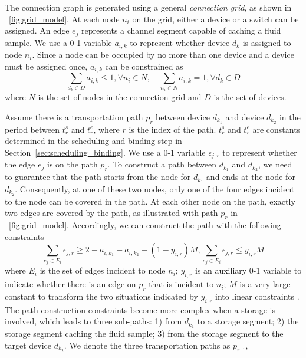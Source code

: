 The connection graph is generated using a general \textit{connection grid}, as
shown in \figname~\ref{fig:grid_model}. At each node $n_i$ on the grid,
either a device or a switch can be assigned. An edge $e_j$ represents
a channel segment capable of caching a fluid sample.
We use a 0-1 variable $a_{i,k}$ to represent whether device $d_k$
is assigned to node $n_i$. Since a node can be occupied by no more than one device
and a device must be assigned once, $a_{i,k}$ can be constrained as
\begin{equation} \label{eq:device_node_1}
\sum_{d_k\in D} a_{i,k}\le 1, \forall n_i\in N, \quad
\sum_{n_i\in N} a_{i,k}=1, \forall d_k\in D
\end{equation}
where $N$ is the set of nodes in the connection grid and $D$ is the set of
devices.

Assume there is a transportation path $p_r$ between
device $d_{k_1}$ and device $d_{k_2}$ in the period between
$t^s_{r}$ and ${t^e_{r}}$, where $r$ is the index of the path.
$t^s_{r}$ and ${t^e_{r}}$ are constants determined in the
scheduling and binding step in Section~\ref{sec:scheduling_binding}.
We use a 0-1 variable $\epsilon_{j,r}$ to represent whether the edge
$e_j$ is on the path $p_r$.
To construct a path between $d_{k_1}$ and $d_{k_2}$, we need to
guarantee that the path starts from the node for $d_{k_1}$
and ends at the node for $d_{k_2}$.
Consequently, at one of these two nodes, only one of the four edges incident
to the node can be covered in the path.
At each other node on the path, exactly two edges are covered by the path, as
illustrated with path $p_r$ in \figname~\ref{fig:grid_model}.
Accordingly, we can
construct the path with the following constraints
\begin{equation}\label{eq:degree}
\sum_{e_j\in E_i}{\epsilon_{j,r}}\ge 2-a_{i, k_1}-a_{i, k_2}-(1-y_{i,r})M,
\sum_{e_j\in E_i}{\epsilon_{j,r}}\le y_{i,r}M
\end{equation}
where $E_i$ is the set of edges incident to node $n_i$; $y_{i,r}$ is an
auxiliary 0-1 variable to indicate
whether there is an edge on $p_r$ that is incident to $n_i$;
$M$ is a very large constant to transform the two
situations indicated by $y_{i,r}$ into linear constraints
\cite{chen2011applied}.
The path construction constraints become more complex when a storage is involved,
            which leads to three sub-paths: 1) from $d_{k_1}$ to a storage segment; 2)
            the storage segment caching the fluid sample; 3) from the storage segment to the
            target device $d_{k_2}$.
            We denote the three transportation paths as $p_{r, 1}$,
